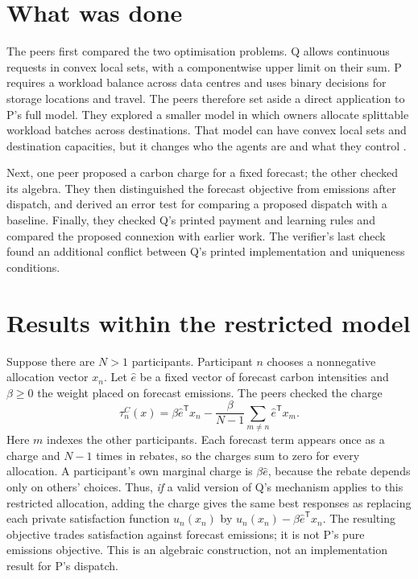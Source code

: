 \documentclass{article}
\begin{document}
\section{What was done}

The peers first compared the two optimisation problems. Q allows continuous requests in convex local
sets, with a componentwise upper limit on their sum. P requires a workload balance across data centres
and uses binary decisions for storage locations and travel. The peers therefore set aside a direct
application to P's full model. They explored a smaller model in which owners allocate splittable workload
batches across destinations. That model can have convex local sets and destination capacities, but it
changes who the agents are and what they control \cite{Q,P}.

Next, one peer proposed a carbon charge for a fixed forecast; the other checked its algebra. They then
distinguished the forecast objective from emissions after dispatch, and derived an error test for
comparing a proposed dispatch with a baseline. Finally, they checked Q's printed payment and learning
rules and compared the proposed connexion with earlier work. The verifier's last check found an
additional conflict between Q's printed implementation and uniqueness conditions.

\section{Results within the restricted model}

Suppose there are \(N>1\) participants. Participant \(n\) chooses a nonnegative allocation vector
\(x_n\). Let \(\widehat e\) be a fixed vector of forecast carbon intensities and \(\beta\geq 0\) the
weight placed on forecast emissions. The peers checked the charge
\[
\tau_n^C(x)=\beta\widehat e^{\mathsf T}x_n
-\frac{\beta}{N-1}\sum_{m\ne n}\widehat e^{\mathsf T}x_m.
\]
Here \(m\) indexes the other participants. Each forecast term appears once as a charge and \(N-1\) times
in rebates, so the charges sum to zero for every allocation. A participant's own marginal charge is
\(\beta\widehat e\), because the rebate depends only on others' choices. Thus, \emph{if} a valid version
of Q's mechanism applies to this restricted allocation, adding the charge gives the same best responses
as replacing each private satisfaction function \(u_n(x_n)\) by \(u_n(x_n)-\beta\widehat e^{\mathsf
T}x_n\). The resulting objective trades satisfaction against forecast emissions; it is not P's pure
emissions objective. This is an algebraic construction, not an implementation result for P's dispatch.
\end{document}
